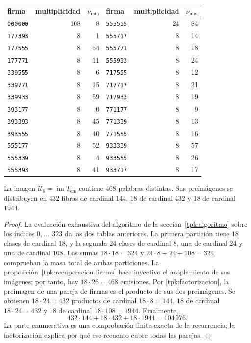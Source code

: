 \begin{tablacompleta}[htbp]
\caption{Las veintiséis firmas multiplicativas.}
\label{tpk:firmas-multiplicativas}
\begin{tabular}{@{}lrr@{\qquad}lrr@{}}
\toprule
firma&multiplicidad&\(\nu_{\min}\)&firma&multiplicidad&\(\nu_{\min}\)\\
\midrule
\texttt{000000}&108&8&\texttt{555555}&24&84\\
\texttt{177393}&8&1&\texttt{555717}&8&14\\
\texttt{177555}&8&54&\texttt{555771}&8&18\\
\texttt{177771}&8&11&\texttt{555933}&8&24\\
\texttt{339555}&8&6&\texttt{717555}&8&12\\
\texttt{339771}&8&15&\texttt{717717}&8&21\\
\texttt{339933}&8&59&\texttt{717933}&8&19\\
\texttt{393177}&8&0&\texttt{771177}&8&9\\
\texttt{393393}&8&45&\texttt{771339}&8&13\\
\texttt{393555}&8&40&\texttt{771555}&8&16\\
\texttt{555177}&8&52&\texttt{933339}&8&57\\
\texttt{555339}&8&4&\texttt{933555}&8&26\\
\texttt{555393}&8&41&\texttt{933717}&8&17\\
\bottomrule
\end{tabular}
\end{tablacompleta}

\begin{proposicion}
\label{tpk:468}
La imagen \(\mathcal U_6=\operatorname{im}T_{\mathrm{em}}\) contiene
\(468\) palabras distintas. Sus preimágenes se distribuyen en \(432\)
fibras de cardinal \(144\), \(18\) de cardinal \(432\) y \(18\) de
cardinal \(1944\).
\end{proposicion}
\begin{proof}
La evaluación exhaustiva del algoritmo de la sección~\ref{tpk:algoritmo}
sobre los índices \(0,\ldots,323\) da las dos tablas anteriores.
La primera partición tiene \(18\) clases de cardinal \(18\), y la segunda
\(24\) clases de cardinal \(8\), una de cardinal \(24\) y una de
cardinal \(108\). Las sumas \(18\cdot18=324\) y
\(24\cdot8+24+108=324\) comprueban la masa total de ambas particiones.
La proposición~\ref{tpk:recuperacion-firmas} hace inyectivo el acoplamiento
de sus imágenes; por tanto, hay \(18\cdot26=468\) emisiones.
Por \eqref{tpk:factorizacion}, la preimagen de una pareja de firmas es
el producto de sus dos preimágenes. Se obtienen \(18\cdot24=432\)
productos de cardinal \(18\cdot8=144\), \(18\) de cardinal
\(18\cdot24=432\) y \(18\) de cardinal \(18\cdot108=1944\).
Finalmente,
\[
 432\cdot144+18\cdot432+18\cdot1944=104\,976.
\]
La parte enumerativa es una comprobación finita exacta de la recurrencia;
la factorización explica por qué ese recuento cubre todas las parejas.
\end{proof}

